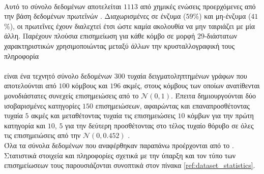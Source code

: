 \paragraph*{} Αυτό το σύνολο δεδομένων αποτελείται $1113$ από χημικές ενώσεις προερχόμενες από την βάση δεδομένων πρωτεΐνών .
Διαχωρισμένες σε ένζυμα ($59$\%) και μη-ένζυμα ($41$\%), οι πρωτεΐνες έχουν διαλεχτεί έτσι ώστε καμία ακολουθία να μην ταιριάζει με μία άλλη.
Παρέχουν πλούσια επισημείωση για κάθε κόμβο σε μορφή $29$-διάστατων χαρακτηριστικών χρησιμοποιώντας μεταξύ άλλων την κρυσταλλογραφική τους πληροφορία \cite{DobsonDoig03, borgwardt2005protein, Neumann2016}

\paragraph*{} είναι ένα τεχνητό σύνολο δεδομένων $300$ τυχαία δειγματοληπτημένων γράφων που αποτελούνται από $100$ κόμβους και $196$ ακμές, στους κόμβους των οποίων ανατίθενται μονοδιάστατες συνεχείς επισημειώσεις από το $\mathcal{N}(0, 1)$.
Έπειτα δημιουργούνται δύο ισοβαρισμένες κατηγορίες $150$ επισημειώσεων, αφαιρώντας και επαναπροσθέτοντας τυχαία $5$ ακμές και μεταθέτοντας τυχαία τις επισημειώσεις $10$ κόμβων για την πρώτη κατηγορία και $10$, $5$ για την δεύτερη προσθέτοντας στο τέλος τυχαίο θόρυβο σε όλες τις επισημειώσεις από την $\mathcal{N}(0, 0.452)$ \cite{Feragen13}.
\newline \\
Όλα τα σύνολα δεδομένων που αναφέρθηκαν παραπάνω προέρχονται από το \cite{KKMMN2016}. Στατιστικά στοιχεία και πληροφορίες σχετικά με την ύπαρξη και τον τύπο των επισημείωσεων τους παρουσιάζονται συνοπτικά στον πίνακα \ref{ref:dataset_statistics}.

